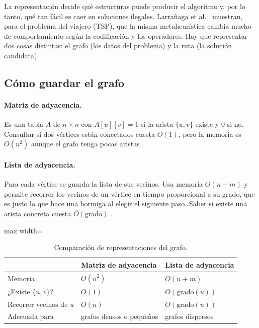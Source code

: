 La representación decide qué estructuras puede producir el algoritmo y, por lo tanto, qué
tan fácil es caer en soluciones ilegales. Larrañaga et al.~\cite{aco4} muestran, para el problema
del viajero (TSP), que la misma metaheurística cambia mucho de comportamiento según la
codificación y los operadores. Hay que representar dos cosas distintas: el grafo
(los datos del problema) y la ruta (la solución candidata).

\subsection{Cómo guardar el grafo}

\paragraph{Matriz de adyacencia.} Es una tabla $A$ de $n\times n$ con $A[u][v]=1$ si la
arista $\{u,v\}$ existe y $0$ si no. Consultar si dos vértices están conectados cuesta
$O(1)$, pero la memoria es $O(n^2)$ aunque el grafo tenga pocas aristas \cite{aco6}.

\paragraph{Lista de adyacencia.} Para cada vértice se guarda la lista de sus vecinos.
Usa memoria $O(n+m)$ y permite recorrer los vecinos de un vértice en tiempo proporcional a
su grado, que es justo lo que hace una hormiga al elegir el siguiente paso. Saber si existe
una arista concreta cuesta $O(\text{grado})$ \cite{aco6}.

\begin{table}[h]
\centering
\caption{Comparación de representaciones del grafo.}
\label{aco:tab:repr-grafo}
\begin{adjustbox}{max width=\linewidth}
\begin{tabular}{@{}lll@{}}
\toprule
 & Matriz de adyacencia & Lista de adyacencia \\
\midrule
Memoria                         & $O(n^2)$ & $O(n+m)$ \\
¿Existe $\{u,v\}$?              & $O(1)$   & $O(\text{grado}(u))$ \\
Recorrer vecinos de $u$         & $O(n)$   & $O(\text{grado}(u))$ \\
Adecuada para                   & grafos densos o pequeños & grafos dispersos \\
\bottomrule
\end{tabular}
\end{adjustbox}
\end{table}


